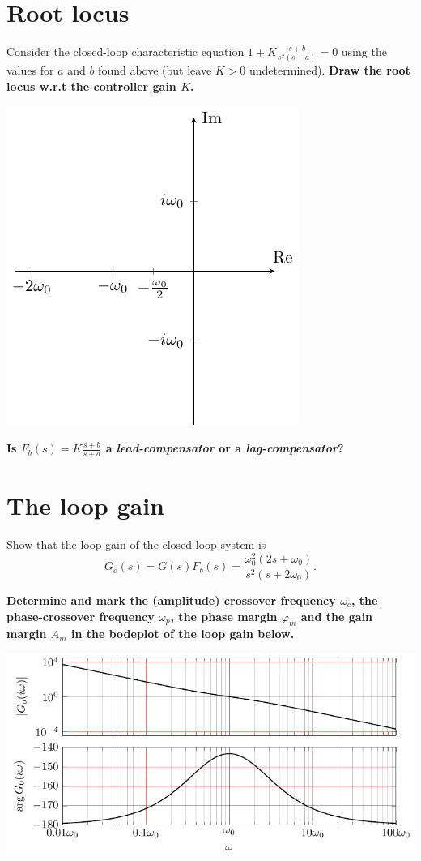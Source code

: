 \documentclass[a4paper]{scrartcl}
\begin{document}
\section*{Root locus}
\label{sec-5}
Consider the closed-loop characteristic equation \(1 + K\frac{s+b}{s^2(s+a)} = 0\) using the values for $a$ and $b$ found above (but leave $K>0$ undetermined). \textbf{Draw the root locus w.r.t the controller gain $K$.}
\begin{center}
 \includegraphics[]{../figures/implane-rlocus}
\end{center}
\textbf{Is \(F_b(s) = K \frac{s+b}{s+a}\) a \emph{lead-compensator} or a \emph{lag-compensator}?}

\section*{The loop gain}
\label{sec-6}
Show that the loop gain of the closed-loop system is
\[G_o(s) = G(s)F_b(s) = \frac{\omega_0^2(2s + \omega_0)}{s^2(s+2\omega_0)}.\]

\textbf{Determine and mark the (amplitude) crossover frequency $\omega_c$, the phase-crossover frequency $\omega_p$, the phase margin $\varphi_m$ and the gain margin $A_m$ in the bodeplot of the loop gain below.}
\begin{center}
\includegraphics[]{../figures/bode-loop-gain}
\end{center}
\end{document}
